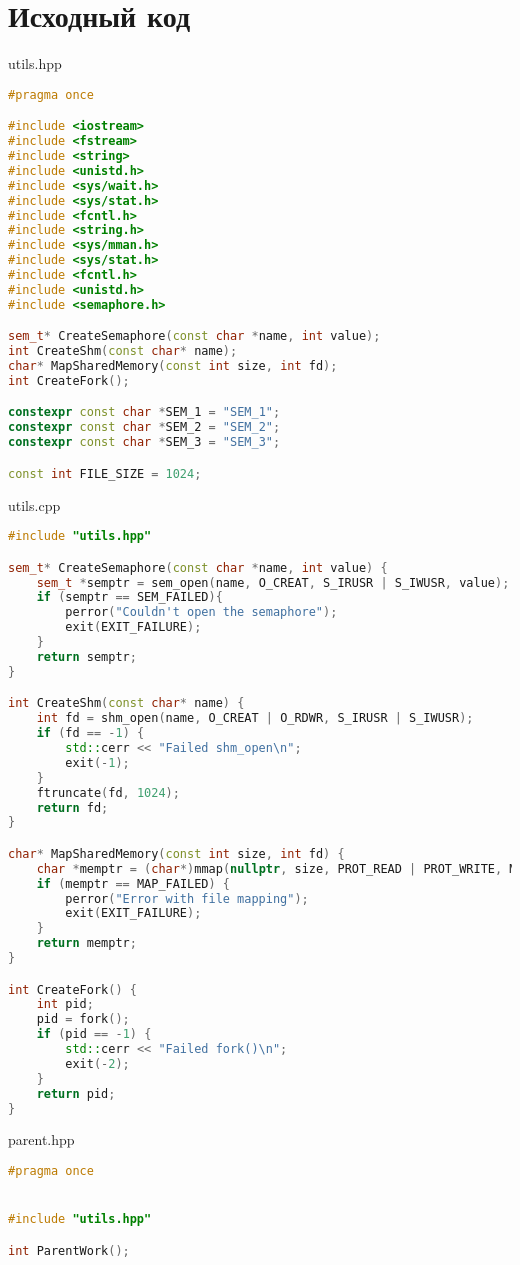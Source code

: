 \documentclass[a4paper, 12pt]{article}
\begin{document}
\newpage

\section{Исходный код}
utils.hpp
\begin{lstlisting}[language=C++]
#pragma once

#include <iostream>
#include <fstream>
#include <string>
#include <unistd.h>
#include <sys/wait.h>
#include <sys/stat.h>
#include <fcntl.h>
#include <string.h>
#include <sys/mman.h>
#include <sys/stat.h>     
#include <fcntl.h>
#include <unistd.h>
#include <semaphore.h>

sem_t* CreateSemaphore(const char *name, int value);
int CreateShm(const char* name);
char* MapSharedMemory(const int size, int fd);
int CreateFork();

constexpr const char *SEM_1 = "SEM_1";
constexpr const char *SEM_2 = "SEM_2";
constexpr const char *SEM_3 = "SEM_3";

const int FILE_SIZE = 1024;

\end{lstlisting}

utils.cpp
\begin{lstlisting}[language=C++]
#include "utils.hpp"

sem_t* CreateSemaphore(const char *name, int value) {
    sem_t *semptr = sem_open(name, O_CREAT, S_IRUSR | S_IWUSR, value);
    if (semptr == SEM_FAILED){
        perror("Couldn't open the semaphore");
        exit(EXIT_FAILURE);
    }
    return semptr;   
}

int CreateShm(const char* name) {
    int fd = shm_open(name, O_CREAT | O_RDWR, S_IRUSR | S_IWUSR);
    if (fd == -1) {
        std::cerr << "Failed shm_open\n";
        exit(-1);
    }
    ftruncate(fd, 1024);
    return fd;
}

char* MapSharedMemory(const int size, int fd) {
    char *memptr = (char*)mmap(nullptr, size, PROT_READ | PROT_WRITE, MAP_SHARED, fd, 0);
    if (memptr == MAP_FAILED) {
        perror("Error with file mapping");
        exit(EXIT_FAILURE);
    }
    return memptr;
}

int CreateFork() {
    int pid;
    pid = fork();
    if (pid == -1) {
        std::cerr << "Failed fork()\n";
        exit(-2);
    }
    return pid;
}
\end{lstlisting}

parent.hpp
\begin{lstlisting}[language=C++]
#pragma once


#include "utils.hpp"

int ParentWork();
\end{lstlisting}
\end{document}
